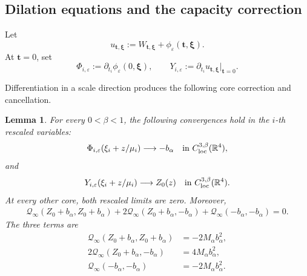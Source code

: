 \documentclass[11pt]{article}
\newtheorem{lemma}[theorem]{Lemma}
\numberwithin{equation}{section}
\begin{document}
\subsection{Dilation equations and the capacity correction}

Let
\[
u_{\boldsymbol t,\boldsymbol\xi}
:=W_{\boldsymbol t,\boldsymbol\xi}
+\phi_\varepsilon(\boldsymbol t,\boldsymbol\xi).
\]
At $\boldsymbol t=0$, set
\[
\Phi_{i,\varepsilon}:=
\partial_{t_i}\phi_\varepsilon(0,\boldsymbol\xi),
\qquad
Y_{i,\varepsilon}:=
\partial_{t_i}u_{\boldsymbol t,\boldsymbol\xi}|_{\boldsymbol t=0}.
\]

Differentiation in a scale direction produces the following core correction and cancellation.

\begin{lemma}\label{lem:scale-corrector}
For every $0<\beta<1$, the following convergences hold in the
$i$-th rescaled variables:
\begin{equation}\label{eq:scale-corrector-limit}
\Phi_{i,\varepsilon}(\xi_i+z/\mu_i)
\longrightarrow-b_\alpha
\quad\hbox{in }C^{3,\beta}_{\rm loc}(\mathbb R^4),
\end{equation}
and
\begin{equation}\label{eq:scale-tangent-limit}
Y_{i,\varepsilon}(\xi_i+z/\mu_i)
\longrightarrow Z_0(z)
\quad\hbox{in }C^{3,\beta}_{\rm loc}(\mathbb R^4).
\end{equation}
At every other core, both rescaled limits are zero. Moreover,
\begin{equation}\label{eq:core-cancellation}
\begin{aligned}
\mathcal Q_\infty(Z_0+b_\alpha,Z_0+b_\alpha)
+2\mathcal Q_\infty(Z_0+b_\alpha,-b_\alpha)
+\mathcal Q_\infty(-b_\alpha,-b_\alpha)=0.
\end{aligned}
\end{equation}
The three terms are
\begin{equation*}
\begin{aligned}
\mathcal Q_\infty(Z_0+b_\alpha,Z_0+b_\alpha)
&=-2M_\alpha b_\alpha^2,\\
2\mathcal Q_\infty(Z_0+b_\alpha,-b_\alpha)
&=4M_\alpha b_\alpha^2,\\
\mathcal Q_\infty(-b_\alpha,-b_\alpha)
&=-2M_\alpha b_\alpha^2.
\end{aligned}
\end{equation*}
\end{lemma}
\end{document}
